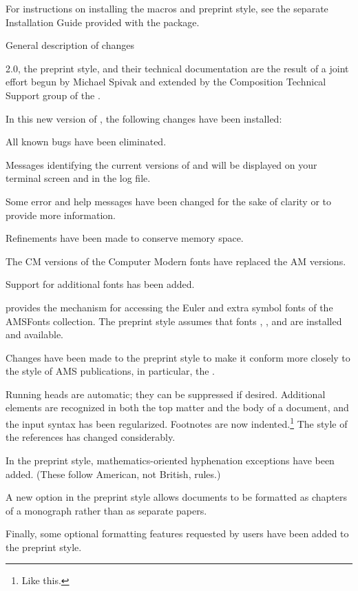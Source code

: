For instructions on installing the \AmSTeX{} macros and preprint style,
see the separate Installation Guide provided with the package.

\subhead General description of changes
\endsubhead

\AmSTeX{} 2.0, the preprint style, and their technical documentation are
the result of a joint effort begun by Michael Spivak and extended
by the Composition Technical Support group of the \AMS.

In this new version of \AmSTeX, the following changes have been installed:
\roster
\item All known bugs have been eliminated.
\item Messages identifying the current versions of 
  and  will be displayed on your terminal screen and
  in the log file.
\item Some error and help messages have been changed for the sake of
  clarity or to provide more information.
\item Refinements have been made to conserve memory space.
\item The CM versions of the Computer Modern fonts have replaced the
  AM versions.
\item Support for additional fonts has been added.
{%
    provides the mechanism for accessing
    the Euler and extra symbol fonts of the AMSFonts collection.
   The preprint style assumes that fonts ,
    , and  are installed and available.
\par}
\item Changes have been made to the preprint style to make it conform
  more closely to the style of AMS publications, in particular, the \JAMS.
{%
   Running heads are automatic; they can be suppressed
    if desired.
   Additional elements are recognized in both the top matter
    and the body of a document, and the input syntax has been regularized.
   Footnotes are now indented.\footnote{Like this.}
   The style of the references has changed considerably.
\par}
\item In the preprint style, mathematics-oriented hyphenation exceptions
  have been added.  (These follow American, not British, rules.)
\item A new option in the preprint style allows documents to be formatted
  as chapters of a monograph rather than as separate papers.
\item Finally, some optional formatting features requested by
  \AmSTeX{} users have been added to the preprint style.
\endroster


